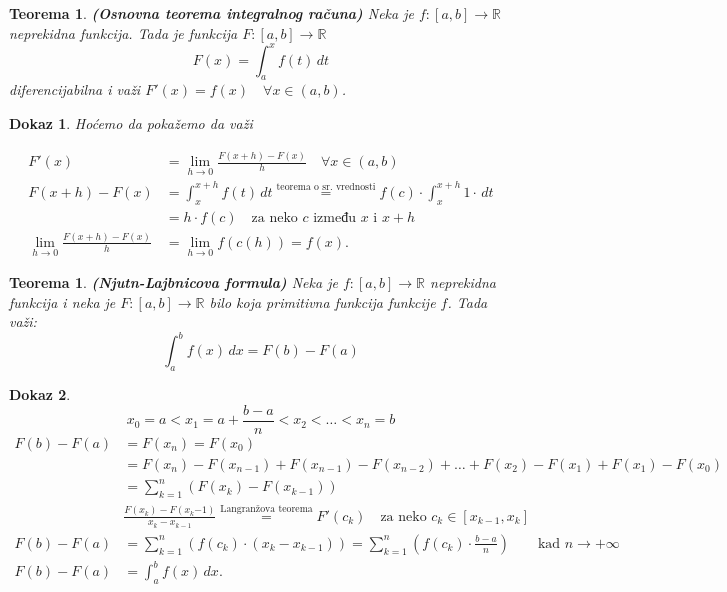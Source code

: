 \documentclass[11pt]{article}
\newcounter{mathitem}
\theoremstyle{plain}
\newtheorem{teorema}[mathitem]{Teorema}
\theoremstyle{serbnodot}
\newtheorem*{dokaz}{Dokaz}
\begin{document}
\begin{teorema}
\textbf{(Osnovna teorema integralnog računa)}
Neka je \(f:[a,b] \to \mathbb{R}\) neprekidna funkcija. Tada je funkcija \(F:[a, b] \to \mathbb{R}\)
\[
  F(x) = \int_{a}^{x} f(t) \, dt
\]
diferencijabilna i važi \(F'(x) = f(x) \quad \forall x \in (a, b)\).
\end{teorema} %

\begin{dokaz}
Hoćemo da pokažemo da važi

\begin{align*}
  F'(x) &= \lim_{h \to 0} \frac{F(x+h) - F(x)}{h} \quad \forall x \in (a, b) \\
  F(x+h) - F(x) &= \int_{x}^{x+h} f(t) \,dt \overset{\text{teorema o sr. vrednosti}}{=}
  f(c) \cdot \int_{x}^{x+h} 1 \cdot \, dt \\
  &= h \cdot f(c) \quad \text{za neko } c \text{ između } x \text{ i } x+h \\
  \lim_{h \to 0} \frac{F(x+h) - F(x)}{h} &= \lim_{h \to 0} f(c(h)) = f(x).
\end{align*}
\end{dokaz}

\begin{teorema}
\textbf{(Njutn-Lajbnicova formula)}
Neka je \(f:[a,b] \to \mathbb{R}\) neprekidna funkcija i neka je \(F:[a, b] \to \mathbb{R}\) bilo koja
primitivna funkcija funkcije \(f\). Tada važi:
\[
  \int_{a}^{b} f(x) \, dx = F(b) - F(a)
\]  
\end{teorema}

\begin{dokaz}
  \[x_0 = a < x_1 = a + \frac{b - a}{n} < x_2 < \dots < x_n = b\]
  \begin{align*}
    F(b) - F(a) &= F(x_n) = F(x_0) \\
    &=F(x_n) - F(x_{n-1}) + F(x_{n-1}) - F(x_{n-2}) + \dots + F(x_2) - F(x_1) + F(x_1) - F(x_0) \\
    &=\sum_{k=1}^{n}(F(x_k)-F(x_{k-1})) \\
    &\frac{F(x_k) - F(x_k{-1})}{x_k - x_{k-1}} \overset{\text{Langranžova teorema}}{=} F'(c_k) \quad \text{za neko } c_k \in [x_{k-1}, x_k] \\
    F(b) - F(a) &= \sum_{k = 1}^{n} (f(c_k) \cdot (x_k - x_{k-1})) = \sum_{k = 1}^{n}(f(c_k) \cdot \frac{b-a}{n})  \qquad \text{kad } n\to+\infty \\
    F(b) - F(a) &= \int_{a}^{b}f(x) \, dx.
  \end{align*}
\end{dokaz}
\end{document}
